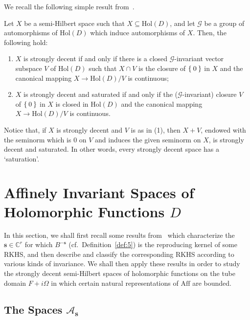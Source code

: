 \documentclass[10.5pt,reqno]{amsart}
\newcommand{\Aff}{\mathrm{Aff}}
\newcommand{\Hol}{\mathrm{Hol}}
\newcommand{\vect}[1]{\mathbf{{#1}}}
\newcommand{\C}{\mathds{C}}
\newcommand{\Ac}{\mathcal{A}}
\newcommand{\Gc}{\mathcal{G}}
\begin{document}
We recall the following simple result from~\cite[Proposition 2.13]{Rango1}.

\begin{prop}\label{prop:6}
	Let $X$ be a semi-Hilbert space  such that $X\subseteq \Hol(D)$, and let $\Gc$ be a group of automorphisms of $\Hol(D)$ which induce automorphisms of $X$. Then, the following hold:
	\begin{enumerate}
		\item[\textnormal{(1)}] $X$ is strongly  decent if and only if there is a closed $\Gc$-invariant vector subspace $V$ of $\Hol(D)$ such that $X\cap V$ is the closure of $\Set{0}$ in $X$ and the canonical mapping $X\to \Hol(D)/V$ is continuous;
		
		\item[\textnormal{(2)}] $X$ is strongly decent and  saturated if and only if the ($\Gc$-invariant) closure $V$ of $\Set{0}$ in $X$ is closed in $\Hol(D)$ and the canonical mapping $X\to \Hol(D)/V$ is continuous.
	\end{enumerate} 
\end{prop}

Notice that, if $X$ is strongly  decent and $V$ is as in (1), then $X+V$, endowed with the seminorm which is $0$ on $V$ and induces the given seminorm on $X$, is strongly decent and  saturated. In other words, every strongly  decent space has a `saturation'.



\section{Affinely Invariant Spaces of Holomorphic Functions $D$}\label{sec:2}


In this section, we shall first recall some results from~\cite{Ishi3,Ishi4,Ishi5} which characterize the $\vect s\in \C^r$ for which $B^{-\vect s}$ (cf.~Definition~\ref{def:5}) is the reproducing kernel of some RKHS, and then describe and classify the corresponding RKHS according to various kinds of invariance. 
We shall then apply these results in order to study the strongly decent semi-Hilbert spaces of holomorphic functions on the tube domain $F+i \Omega$ in which certain natural representations of $\Aff$ are bounded.



 
\subsection{The Spaces $\Ac_{\vect s}$}
\end{document}
